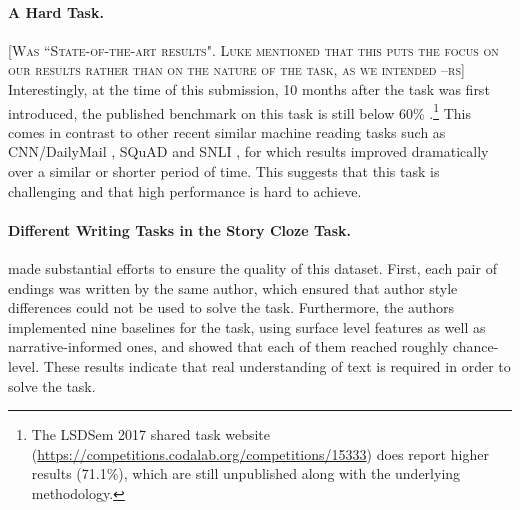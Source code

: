 \documentclass[11pt,a4paper]{article}
\newcommand{\resolved}[1]{}
\newcommand{\roy}[1]{{\color{orange}\textsc{[#1 --rs]}}}
\newcommand{\yc}[1]{{\color{bblue}\{\textit{#1}\}$_{yc}$}}
\newcommand{\nascomment}[1]{{\color{blue}\textsc{[#1 --nas]}}}
\begin{document}
\paragraph{A Hard Task.}\roy{Was ``State-of-the-art results". Luke mentioned that this puts the focus on our results rather than on the nature of the task, as we intended}
Interestingly, at the time of this submission, 10 months after the
task was first introduced, the published benchmark on this task is
still below 60\% \cite{Salle:2016}.\footnote{The LSDSem 2017 shared
  task website (\url{https://competitions.codalab.org/competitions/15333}) does report higher results (71.1\%), which are still
  unpublished along with the underlying methodology.}
This comes in contrast to other recent similar machine reading tasks such as CNN/DailyMail \cite{hermann2015teaching}, SQuAD \cite{rajpurkar2016squad} and SNLI \cite{bowman2015large}, for which results improved dramatically over a similar or shorter period of time.
This suggests that this task is challenging and that high performance is hard to achieve.
 \resolved{\yc{SQuAD was officially published in Nov 2016. by the time the official EMNLP talk was presented, the leaderboard performance (still unpublished) was  30\% beyond the best results in the paper. Given that, the statement of this paragraph seems a bit of overkill...?} \nascomment{it sounds like Yejin is saying that on squad, there was an even faster acceleration?  or that we should change ``similar period of time'' to ``similar or shorter period of time''?}}

\paragraph{Different Writing Tasks in the Story Cloze Task.}
\citet{Mostafazadeh:2016} made substantial efforts to ensure the quality of this dataset. 
First, each pair of endings was written by the same author, which ensured that author style differences could not be used to solve the task. 
Furthermore, the authors implemented nine baselines for the task, using surface level features as well as narrative-informed ones, and showed that each of them reached roughly chance-level.
These results indicate that real understanding of text is required in order to solve the task.
\end{document}
